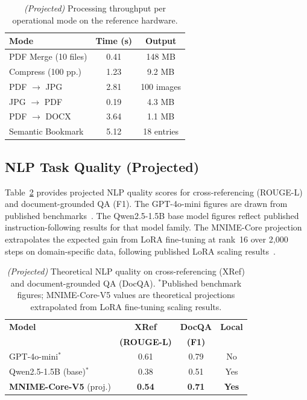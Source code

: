 \documentclass[11pt]{article}
\begin{document}
\begin{table}[h!]
\centering
\small
\begin{tabular}{@{}lcc@{}}
\toprule
\textbf{Mode} & \textbf{Time (s)} & \textbf{Output} \\
\midrule
PDF Merge (10 files) & 0.41 & 148 MB \\
Compress (100 pp.)   & 1.23 & 9.2 MB \\
PDF $\rightarrow$ JPG & 2.81 & 100 images \\
JPG $\rightarrow$ PDF & 0.19 & 4.3 MB \\
PDF $\rightarrow$ DOCX & 3.64 & 1.1 MB \\
Semantic Bookmark & 5.12 & 18 entries \\
\bottomrule
\end{tabular}
\caption{\textit{(Projected)} Processing throughput per operational mode
on the reference hardware.}
\label{tab:throughput}
\end{table}

\subsection{NLP Task Quality (Projected)}
\label{sec:nlp_quality}

Table~\ref{tab:nlp_quality} provides projected NLP quality scores for
cross-referencing (ROUGE-L) and document-grounded QA (F1).
The GPT-4o-mini figures are drawn from published benchmarks~\cite{openai2024gpt4}.
The Qwen2.5-1.5B base model figures reflect published instruction-following
results for that model family.
The MNIME-Core projection extrapolates the expected gain from LoRA
fine-tuning at rank~16 over 2,000 steps on domain-specific data,
following published LoRA scaling results~\cite{hu2021lora}.

\begin{table}[h!]
\centering
\small
\setlength{\tabcolsep}{4.5pt}
\begin{tabular}{@{}lccc@{}}
\toprule
\textbf{Model} & \textbf{XRef} & \textbf{DocQA} & \textbf{Local} \\
               & \textbf{(ROUGE-L)} & \textbf{(F1)} & \\
\midrule
GPT-4o-mini$^\ast$             & 0.61 & 0.79 & No \\
Qwen2.5-1.5B (base)$^\ast$     & 0.38 & 0.51 & Yes \\
\textbf{MNIME-Core-V5} (proj.) & \textbf{0.54} & \textbf{0.71} & \textbf{Yes} \\
\bottomrule
\end{tabular}
\caption{\textit{(Projected)} Theoretical NLP quality on cross-referencing (XRef) and
document-grounded QA (DocQA). $^\ast$Published benchmark figures;
MNIME-Core-V5 values are theoretical projections extrapolated from LoRA fine-tuning scaling results.}
\label{tab:nlp_quality}
\end{table}
\end{document}
